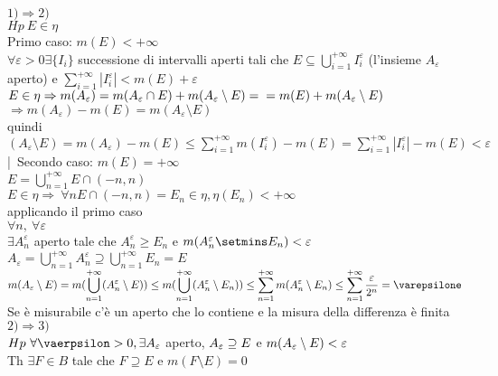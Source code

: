 \documentclass[12px]{article}
\begin{document}
\begin{dimo}
	$1) \Rightarrow 2)$ \\
	$Hp \ E\in \eta$\\
	Primo caso:  $m(E) < +\infty$\\
	$\forall\varepsilon > 0 \exists\{I_i\}$ successione di intervalli aperti tali che $E\subseteq \bigcup^{+\infty}_{i = 1}I_i^\varepsilon$ (l'insieme $A_\varepsilon$ aperto) e $ \sum^{+\infty}_{i = 1}|I_i^\varepsilon| < m(E) + \varepsilon$\\
	$E\in \eta \Rightarrow  m(A_\varepsilon) = m(A_\varepsilon\cap E) + m(A_\varepsilon\setminus E) = \\
	=m(E) + m(A_\varepsilon\setminus E)$ \\
	$ \Rightarrow m(A_\varepsilon) - m(E) = m(A_\varepsilon\setminus E)$ \\
	quindi\\
	$(A_\varepsilon\setminus E) = m(A_\varepsilon) - m(E)\leq \sum^{+\infty}_{i = 1} m(I_i^\varepsilon) - m(E) = \sum^{+\infty}_{i = 1}|I_i^\varepsilon | -m(E) < \varepsilon $|\
	Secondo caso: $m(E) = +\infty$ \\
	$E = \bigcup^{+\infty}_{n= 1}E\cap (-n,n)$\\
	$E\in\eta \Rightarrow \ \forall n E\cap (-n,n) = E_n \in \eta, \eta(E_n) < +\infty$ \\
	applicando il primo caso \\
	$\forall n, \ \forall\varepsilon$\\
	 $\exists A_n^\varepsilon$ aperto tale che $A_n^\varepsilon \geq E_n$ e  $m(A_n^\varepsilon \setmins E_n) < \varepsilon$\\
	  $A_\varepsilon = \bigcup^{+\infty}_{n=1}A_n^\varepsilon\supseteq \bigcup^{+\infty}_{n = 1}E_n = E$\\
	  $m(A_\varepsilon\setminus E) = m(\displaystyle \bigcup^{+\infty}_{n = 1}(A_n^\varepsilon \setminus E)) \leq m( \bigcup^{+\infty}_{n = 1}(A_n^\varepsilon\setminus E_n))\leq \sum^{+\infty}_{n = 1}m(A_n^\varepsilon\setminus E_n) \leq \sum^{+\infty}_{n=1}\frac{\varepsilon}{2^n} = \varepsilone$ \\
	  Se è misurabile c'è un aperto che lo contiene e la misura della differenza è finita\\[10px]
	  $2) \Rightarrow  3)$ \\
	  $Hp \ \forall \vaerpsilon > 0, \exists A_\varepsilon $ aperto, $A_\varepsilon\supseteq E$  e $m(A_\varepsilon\setminus E)< \varepsilon$\\
	  Th  $\exists F\in B$ tale che $F \supseteq E$ e  $m(F\setminus E) = 0$\\

\end{dimo}
\end{document}
